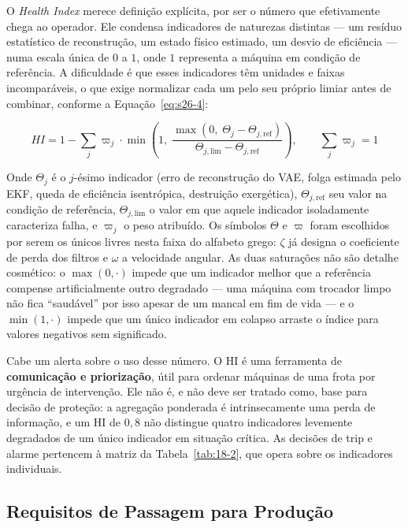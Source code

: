 \documentclass[12pt,a4paper]{article}
\numberwithin{equation}{section}
\numberwithin{table}{section}
\numberwithin{figure}{section}
\begin{document}
{	O \textit{Health Index} merece definição explícita, por ser o número que efetivamente chega ao operador. Ele condensa indicadores de naturezas distintas — um resíduo estatístico de reconstrução, um estado físico estimado, um desvio de eficiência — numa escala única de $0$ a $1$, onde $1$ representa a máquina em condição de referência. A dificuldade é que esses indicadores têm unidades e faixas incomparáveis, o que exige normalizar cada um pelo seu próprio limiar antes de combinar, conforme a Equação~\eqref{eq:s26-4}:

	\begin{equation}\label{eq:s26-4}
	HI = 1 - \sum_{j} \varpi_j \cdot \min\left( 1,\; \frac{\max(0,\; \Theta_j - \Theta_{j,\text{ref}})}{\Theta_{j,\text{lim}} - \Theta_{j,\text{ref}}} \right), \qquad \sum_j \varpi_j = 1
\end{equation}

	Onde $\Theta_j$ é o $j$-ésimo indicador (erro de reconstrução do VAE, folga estimada pelo EKF, queda de eficiência isentrópica, destruição exergética), $\Theta_{j,\text{ref}}$ seu valor na condição de referência, $\Theta_{j,\text{lim}}$ o valor em que aquele indicador isoladamente caracteriza falha, e $\varpi_j$ o peso atribuído. Os símbolos $\Theta$ e $\varpi$ foram escolhidos por serem os únicos livres nesta faixa do alfabeto grego: $\zeta$ já designa o coeficiente de perda dos filtros e $\omega$ a velocidade angular. As duas saturações não são detalhe cosmético: o $\max(0,\cdot)$ impede que um indicador melhor que a referência compense artificialmente outro degradado — uma máquina com trocador limpo não fica ``saudável'' por isso apesar de um mancal em fim de vida — e o $\min(1,\cdot)$ impede que um único indicador em colapso arraste o índice para valores negativos sem significado.

	Cabe um alerta sobre o uso desse número. O HI é uma ferramenta de \textbf{comunicação e priorização}, útil para ordenar máquinas de uma frota por urgência de intervenção. Ele não é, e não deve ser tratado como, base para decisão de proteção: a agregação ponderada é intrinsecamente uma perda de informação, e um HI de $0{,}8$ não distingue quatro indicadores levemente degradados de um único indicador em situação crítica. As decisões de trip e alarme pertencem à matriz da Tabela~\ref{tab:18-2}, que opera sobre os indicadores individuais.

	\subsection{Requisitos de Passagem para Produção}

}
\end{document}
